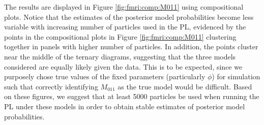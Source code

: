 The results are displayed in Figure \ref{fig:fmri:comp:M011} using compositional plots. Notice that the estimates of the posterior model probabilities become less variable with increasing number of particles used in the PL, evidenced by the points in the compositional plots in Figure \ref{fig:fmri:comp:M011} clustering together in panels with higher number of particles. In addition, the points cluster near the middle of the ternary diagrams, suggesting that the three models considered are equally likely given the data. This is to be expected, since we purposely chose true values of the fixed parameters (particularly $\phi$) for simulation such that correctly identifying $M_{011}$ as the true model would be difficult. Based on these figures, we suggest that at least 5000 particles be used when running the PL under these models in order to obtain stable estimates of posterior model probabilities.

%
%

